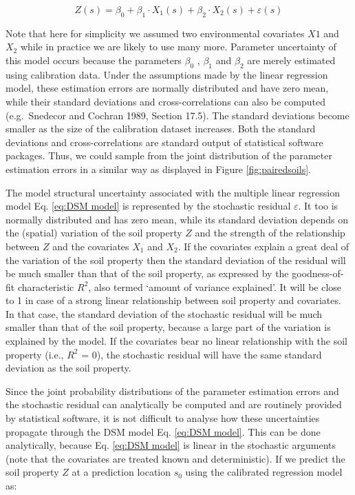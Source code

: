 \documentclass[10pt,b5paper,]{book}
\theoremstyle{definition}
\theoremstyle{definition}
\theoremstyle{definition}
\theoremstyle{remark}
\begin{document}
\begin{equation}
\label{eq:DSM model}
Z(s) = \beta_0 + \beta_1  \cdot X_1 (s) + \beta_2 \cdot X_2 (s) + \varepsilon(s)
\end{equation}

Note that here for simplicity we assumed two environmental covariates
\({X1}\) and \({X_2}\) while in practice we are likely to use many more.
Parameter uncertainty of this model occurs because the parameters
\({\beta_0}\) , \({\beta_1}\) and \({\beta_2}\) are merely estimated
using calibration data. Under the assumptions made by the linear
regression model, these estimation errors are normally distributed and
have zero mean, while their standard deviations and cross-correlations
can also be computed (e.g.~Snedecor and Cochran 1989, Section 17.5). The
standard deviations become smaller as the size of the calibration
dataset increases. Both the standard deviations and cross-correlations
are standard output of statistical software packages. Thus, we could
sample from the joint distribution of the parameter estimation errors in
a similar way as displayed in Figure \ref{fig:pairedsoils}.

The model structural uncertainty associated with the multiple linear
regression model Eq. \ref{eq:DSM model} is represented by the stochastic
residual \({\varepsilon}\). It too is normally distributed and has zero
mean, while its standard deviation depends on the (spatial) variation of
the soil property \(Z\) and the strength of the relationship between
\(Z\) and the covariates \({X_1}\) and \({X_2}\). If the covariates
explain a great deal of the variation of the soil property then the
standard deviation of the residual will be much smaller than that of the
soil property, as expressed by the goodness-of-fit characteristic
\({R^2}\), also termed `amount of variance explained'. It will be close
to 1 in case of a strong linear relationship between soil property and
covariates. In that case, the standard deviation of the stochastic
residual will be much smaller than that of the soil property, because a
large part of the variation is explained by the model. If the covariates
bear no linear relationship with the soil property (i.e., \({R^2}\) =
0), the stochastic residual will have the same standard deviation as the
soil property.

Since the joint probability distributions of the parameter estimation
errors and the stochastic residual can analytically be computed and are
routinely provided by statistical software, it is not difficult to
analyse how these uncertainties propagate through the DSM model Eq.
\ref{eq:DSM model}. This can be done analytically, because Eq.
\ref{eq:DSM model} is linear in the stochastic arguments (note that the
covariates are treated known and deterministic). If we predict the soil
property \(Z\) at a prediction location \({s_0}\) using the calibrated
regression model as:
\end{document}
